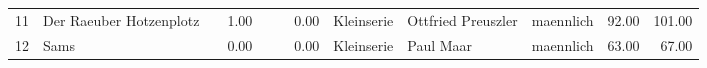 \begin{table}
\begin{center}
{\begin{tabular}{rllrllrlllrr}
  11 & Der Raeuber Hotzenplotz                                                                                                                                                                                                                                         &                                                                                                                                                                                                                                                                 & 1.00 &                                                                                                                                                                                                                                                                 &                                                                                                                                                                                                                                                                 & 0.00 & Kleinserie & Ottfried Preuszler                                                                                                                                                                                                                                              & maennlich & 92.00 & 101.00 \\ 
  12 & Sams                                                                                                                                                                                                                                                            &                                                                                                                                                                                                                                                                 & 0.00 &                                                                                                                                                                                                                                                                 &                                                                                                                                                                                                                                                                 & 0.00 & Kleinserie & Paul Maar                                                                                                                                                                                                                                                       & maennlich & 63.00 & 67.00 \\ 

\end{tabular}}
\end{center}
\end{table}
